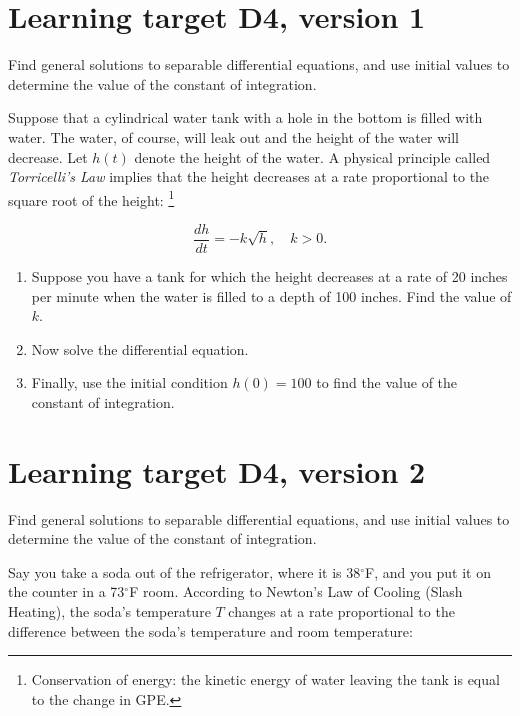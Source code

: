 


\renewcommand{\thefootnote}{\fnsymbol{footnote}}



\everymath{\displaystyle}

\section{Learning target D4, version 1}

Find general solutions to separable differential equations, and use initial values to determine the value of the constant of integration.

\hrulefill

Suppose that a cylindrical water tank with a hole in the bottom is filled with water. The water, of course, will leak out and the height of the water will decrease. Let $h(t)$ denote the height of the water. A physical principle called \textit{Torricelli's Law} implies that the height decreases at a rate proportional to the square root of the height:
\footnote{Conservation of energy: the kinetic energy of water leaving the tank is equal to the change in GPE.}

\[\dfrac{dh}{dt} = -k \sqrt{h}, \quad k > 0.
\]

\begin{enumerate}
	\item Suppose you have a tank for which the height decreases at a rate of 20 inches per minute when the water is filled to a depth of 100 inches. Find the value of $k$.
	\vfill
	\item Now solve the differential equation.
	\vfill
	\vfill
	\item Finally, use the initial condition $h(0) = 100$ to find the value of the constant of integration.
	\vfill
\end{enumerate}
\pagebreak
\section{Learning target D4, version 2}

Find general solutions to separable differential equations, and use initial values to determine the value of the constant of integration.

\hrulefill

Say you take a soda out of the refrigerator, where it is 38$^\circ$F, and you put it on the counter in a 73$^\circ$F room. According to Newton's Law of Cooling (Slash Heating), the soda's temperature $T$ changes at a rate proportional to the difference between the soda's temperature and room temperature:

